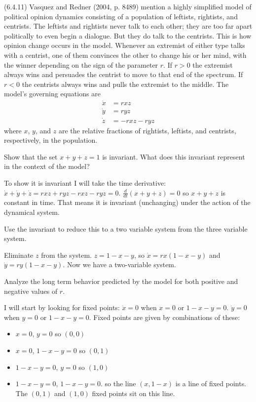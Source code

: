 \documentclass[12pt,letterpaper,answers]{exam}
\begin{document}
\begin{questions}
\question (6.4.11) Vasquez and Redner (2004, p. 8489) mention a highly simplified model of political opinion dynamics consisting of a population of leftists, rightists, and centrists.  The leftists and rightists never talk to each other; they are too far apart politically to even begin a dialogue.  But they do talk to the centrists.  This is how opinion change occurs in the model.  Whenever an extremist of either type talks with a centrist, one of them convinces the other to change his or her mind, with the winner depending on the sign of the parameter $r$.  If $r>0$ the extremist always wins and persuades the centrist to move to that end of the spectrum.  If $r<0$ the centrists always wins and pulls the extremist to the middle.  The model's governing equations are
\begin{align*}
\dot{x}&= r x z \\
\dot{y}&=r y z\\
\dot{z}&=-rxz-ryz
\end{align*}
where $x$, $y$, and $z$ are the relative fractions of rightists, leftists, and centrists, respectively, in the population.
\begin{parts}
\item Show that the set $x+y+z = 1$ is invariant.  What does this invariant represent in the context of the model?
\begin{solution}
To show it is invariant I will take the time derivative: $\dot{x} + \dot{y} + \dot{z} = r x z + r y z - r x z - r y z = 0$.  $\frac{d}{dt}(x+y+z) = 0$ so $x+y+z$ is constant in time.  That means it is invariant (unchanging) under the action of the dynamical system.
\end{solution}
\item Use the invariant to reduce this to a two variable system from the three variable system.
\begin{solution}
Eliminate $z$ from the system. $z = 1- x- y$, so $\dot{x} = rx (1-x-y)$ and $\dot{y} = r y (1-x-y)$.  Now we have a two-variable system.
\end{solution}
\item Analyze the long term behavior predicted by the model for both positive and negative values of $r$.
\begin{solution}
I will start by looking for fixed points:
$\dot{x} = 0$ when $x=0$ or $1-x-y = 0$.  $\dot{y} = 0$ when $ y = 0$ or $1 -x - y = 0$.  Fixed points are given by combinations of these:
\begin{itemize}
\item $x = 0$, $y = 0$ so $(0,0)$
\item $x = 0$, $1-x-y = 0$ so $(0,1)$
\item $1-x-y = 0$, $y = 0$ so $(1,0)$
\item $1 -x -y = 0$, $1-x-y = 0$. so the line $(x, 1-x)$ is a line of fixed points.  The $(0,1)$ and $(1,0)$ fixed points sit on this line.
\end{itemize}


\end{solution}
\end{parts}
\end{questions}
\end{document}
